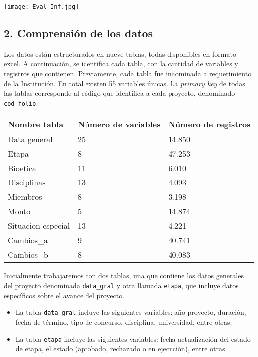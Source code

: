 \documentclass[
]{article}
\providecommand{\tightlist}{%
  \setlength{\itemsep}{0pt}\setlength{\parskip}{0pt}}
\begin{document}
\texttt{[image: Eval Inf.jpg]}

\hypertarget{comprensiuxf3n-de-los-datos}{%
\subsection{2. Comprensión de los
datos}\label{comprensiuxf3n-de-los-datos}}

Los datos están estructurados en nueve tablas, todas disponibles en
formato excel. A continuación, se identifica cada tabla, con la cantidad
de variables y registros que contienen. Previamente, cada tabla fue
innominada a requerimiento de la Institución. En total existen 55
variables únicas. La \emph{primary key} de todas las tablas corresponde
al código que identifica a cada proyecto, denominado
\texttt{cod\_folio}.

\begin{longtable}[]{@{}lll@{}}
\toprule
Nombre tabla & Número de variables & Número de registros \\
\midrule
\endhead
Data general & 25 & 14.850 \\
Etapa & 8 & 47.253 \\
Bioetica & 11 & 6.010 \\
Disciplinas & 13 & 4.093 \\
Miembros & 8 & 3.198 \\
Monto & 5 & 14.874 \\
Situacion especial & 13 & 4.221 \\
Cambios\_a & 9 & 40.741 \\
Cambios\_b & 8 & 40.083 \\
\bottomrule
\end{longtable}

Inicialmente trabajaremos con dos tablas, una que contiene los datos
generales del proyecto denominada \texttt{data\_gral} y otra llamada
\texttt{etapa}, que incluye datos específicos sobre el avance del
proyecto.

\begin{itemize}
\tightlist
\item
  La tabla \texttt{data\_gral} incluye las siguientes variables: año
  proyecto, duración, fecha de término, tipo de concurso, disciplina,
  universidad, entre otras.
\item
  La tabla \texttt{etapa} incluye las siguientes variables: fecha
  actualización del estado de etapa, el estado (aprobado, rechazado o en
  ejecución), entre otras.
\end{itemize}
\end{document}

